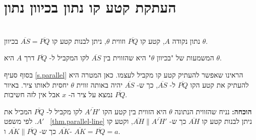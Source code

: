 \section{העתקת קטע קו נתון בכיוון נתון}\label{s.direction}

\begin{theorem}\label{thm.angle}\mbox{}\\
נתון נקודה
$A$,
קטע קו
$\overline{PQ}$
וזווית
$\theta$,
ניתן לבנות קטע קו
$\overline{AS}=\overline{PQ}$
בכיוון 
$\theta$.
\end{theorem}

%

המשמעות של "בכיוון 
$\theta$"
היא שהזווית בין 
$\overline{AS}$
לקו המקביל ל-%
$\overline{PQ}$
דרך
$A$
היא
$\theta$.

בסוף סעיף
\ref{s.parallel}
הראינו שאפשר להעתיק קטע קו מקביל לעצמו. כאן המטרה היא להעתיק את קטע הקו
$\overline{PQ}$
ל-%
$\overline{AS}$,
כך ש-%
$\overline{AS}$
יהיה באותה זווית
$\theta$
יחסית לאותו ציר. באיור
$\overline{PQ}$
נמצא על ציר ה-%
$x$
אבל אין לזה חשיבות.


\textbf{הוכחה:}
נניח שהזווית הנתונה
$\theta$
היא הזווית בין קטע הקו
$\overline{A'H'}$
לקו מקביל ל-%
$\overline{PQ}$
המכיל את
$A'$.
לפי משפט~%
\ref{thm.parallel-line}
ניתן לבנות קטע קו
$\overline{AH}$
כך ש-%
$\overline{AH}\|\overline{A'H'}$,
וקטע קו
$\overline{AK}$
כך ש-%
$\overline{AK}\|\overline{PQ}$
ו-%
$\overline{AK}=\overline{PQ}=a$.

